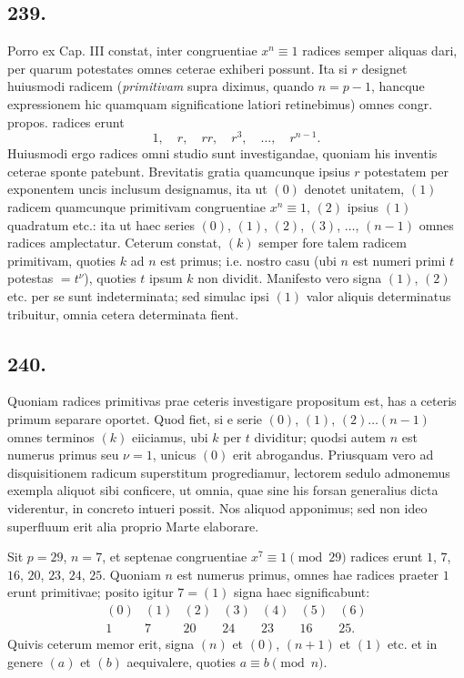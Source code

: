 \documentclass[12pt]{article}
\begin{document}
\subsection*{239.}
Porro ex Cap. III constat, inter congruentiae $x^n\equiv 1$ radices semper aliquas dari, per quarum potestates omnes ceterae exhiberi possunt. Ita si $r$ designet huiusmodi radicem (\textit{primitivam} supra diximus, quando $n=p-1$, hancque expressionem hic quamquam significatione latiori retinebimus) omnes congr. propos. radices erunt
\[
1,\quad r,\quad rr,\quad r^3,\quad \ldots,\quad r^{n-1}.
\]
Huiusmodi ergo radices omni studio sunt investigandae, quoniam his inventis ceterae sponte patebunt. Brevitatis gratia quamcunque ipsius $r$ potestatem per exponentem uncis inclusum designamus, ita ut $(0)$ denotet unitatem, $(1)$ radicem quamcunque primitivam congruentiae $x^n\equiv 1$, $(2)$ ipsius $(1)$ quadratum etc.: ita ut haec series $(0)$, $(1)$, $(2)$, $(3)$, $\ldots$, $(n-1)$ omnes radices amplectatur. Ceterum constat, $(k)$ semper fore talem radicem primitivam, quoties $k$ ad $n$ est primus; i.e. nostro casu (ubi $n$ est numeri primi $t$ potestas $=t^\nu$), quoties $t$ ipsum $k$ non dividit. Manifesto vero signa $(1)$, $(2)$ etc. per se sunt indeterminata; sed simulac ipsi $(1)$ valor aliquis determinatus tribuitur, omnia cetera determinata fient.

\subsection*{240.}
Quoniam radices primitivas prae ceteris investigare propositum est, has a ceteris primum separare oportet. Quod fiet, si e serie $(0)$, $(1)$, $(2)\ldots(n-1)$ omnes terminos $(k)$ eiiciamus, ubi $k$ per $t$ dividitur; quodsi autem $n$ est numerus primus seu $\nu=1$, unicus $(0)$ erit abrogandus. Priusquam vero ad disquisitionem radicum superstitum progrediamur, lectorem sedulo admonemus exempla aliquot sibi conficere, ut omnia, quae sine his forsan generalius dicta viderentur, in concreto intueri possit. Nos aliquod apponimus; sed non ideo superfluum erit alia proprio Marte elaborare.

Sit $p=29$, $n=7$, et septenae congruentiae $x^7\equiv 1\pmod {29}$ radices erunt $1$, $7$, $16$, $20$, $23$, $24$, $25$. Quoniam $n$ est numerus primus, omnes hae radices praeter $1$ erunt primitivae; posito igitur $7=(1)$ signa haec significabunt:
\[
\begin{array}{ccccccc}
(0)&(1)&(2)&(3)&(4)&(5)&(6)\\
1&7&20&24&23&16&25.
\end{array}
\]
Quivis ceterum memor erit, signa $(n)$ et $(0)$, $(n+1)$ et $(1)$ etc. et in genere $(a)$ et $(b)$ aequivalere, quoties $a\equiv b\pmod n$.
\end{document}
